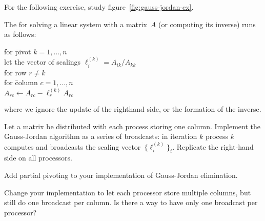 For the following exercise, study figure~\ref{fig:gauss-jordan-ex}.

\begin{exercise}
  \label{ex:gaussjordancoll}
  The  for solving a linear system
  with a matrix~$A$ (or computing its inverse) runs as follows:
  {\small
  \begin{tabbing}
    for \=pivot $k=1,\ldots,n$\\
    \>let the vector of scalings $\ell^{(k)}_i=A_{ik}/A_{kk}$\\
    \>for \=row $r\not=k$\\
    \>\>for \=column $c=1,\ldots,n$\\
    \>\>\> $A_{rc}\leftarrow A_{rc} - \ell^{(k)}_r A_{rc}$\\
  \end{tabbing}
  }
  where we ignore the update of the righthand side, or the formation
  of the inverse.

  Let a matrix be distributed with each process storing one
  column. Implement the Gauss-Jordan algorithm as a series of
  broadcasts: in iteration $k$ process $k$ computes and broadcasts the
  scaling vector~$\{\ell^{(k)}_i\}_i$. Replicate the right-hand side on
  all processors.
\end{exercise}

\begin{exercise}
  Add partial pivoting to your implementation of Gauss-Jordan elimination.

  Change your implementation to let each processor store multiple columns,
  but still do one broadcast per column. Is there a way to have only one
  broadcast per processor?
\end{exercise}

